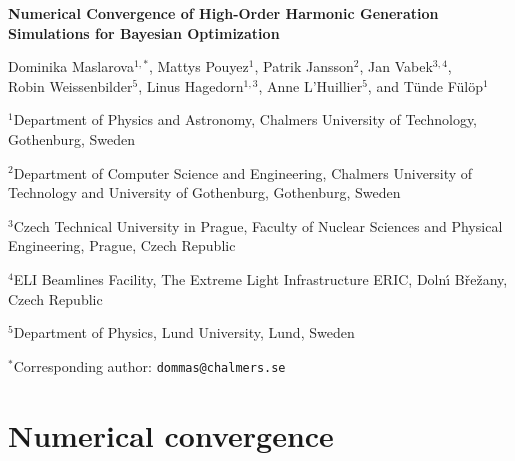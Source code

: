 \documentclass[11pt,a4paper]{article}
\begin{document}
\begin{center}
{\LARGE\bfseries
Numerical Convergence of High-Order Harmonic Generation Simulations for Bayesian Optimization\par}

\vspace{1.1em}

{\normalsize
Dominika Maslarova$^{1,*}$, Mattys Pouyez$^{1}$,
Patrik Jansson$^{2}$, Jan Vabek$^{3,4}$,\\
Robin Weissenbilder$^{5}$, Linus Hagedorn$^{1,3}$,
Anne L'Huillier$^{5}$, and Tünde Fülöp$^{1}$\par}

\vspace{1em}

\begin{minipage}{0.95\textwidth}
\centering
\small

$^{1}$Department of Physics and Astronomy,
Chalmers University of Technology, Gothenburg, Sweden\par
\vspace{0.25em}

$^{2}$Department of Computer Science and Engineering,
Chalmers University of Technology and University of Gothenburg,
Gothenburg, Sweden\par
\vspace{0.25em}

$^{3}$Czech Technical University in Prague,
Faculty of Nuclear Sciences and Physical Engineering,
Prague, Czech Republic\par
\vspace{0.25em}

$^{4}$ELI Beamlines Facility,
The Extreme Light Infrastructure ERIC,
Doln\'{\i} B\v{r}e\v{z}any, Czech Republic\par
\vspace{0.25em}

$^{5}$Department of Physics,
Lund University, Lund, Sweden\par

\vspace{0.7em}

$^{*}$Corresponding author:
\texttt{dommas@chalmers.se}

\end{minipage}
\end{center}

\vspace{1.2em}


\section{Numerical convergence}\label{sec:numconv}
\end{document}
